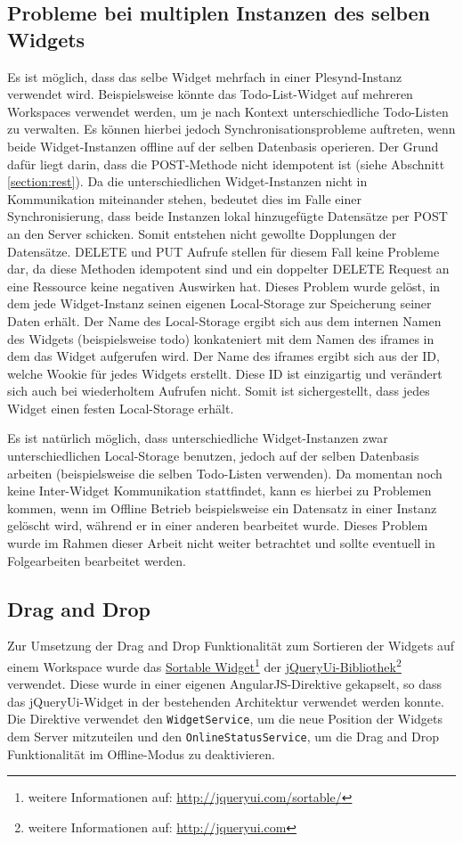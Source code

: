 \subsection{Probleme bei multiplen Instanzen des selben Widgets}
Es ist möglich, dass das selbe Widget mehrfach in einer Plesynd-Instanz verwendet wird. Beispielsweise könnte das Todo-List-Widget auf mehreren Workspaces verwendet werden, um je nach Kontext unterschiedliche Todo-Listen zu verwalten. Es können hierbei jedoch Synchronisationsprobleme auftreten, wenn beide Widget-Instanzen offline auf der selben Datenbasis operieren. Der Grund dafür liegt darin, dass die POST-Methode nicht idempotent ist (siehe Abschnitt \ref{section:rest}). Da die unterschiedlichen Widget-Instanzen nicht in Kommunikation miteinander stehen, bedeutet dies im Falle einer Synchronisierung, dass beide Instanzen lokal hinzugefügte Datensätze per POST an den Server schicken. Somit entstehen nicht gewollte Dopplungen der Datensätze. DELETE und PUT Aufrufe stellen für diesem Fall keine Probleme dar, da diese Methoden idempotent sind und ein doppelter DELETE Request an eine Ressource keine negativen Auswirken hat. Dieses Problem wurde gelöst, in dem jede Widget-Instanz seinen eigenen Local-Storage zur Speicherung seiner Daten erhält. Der Name des Local-Storage ergibt sich aus dem internen Namen des Widgets (beispielsweise todo) konkateniert mit dem Namen des iframes in dem das Widget aufgerufen wird. Der Name des iframes ergibt sich aus der ID, welche Wookie für jedes Widgets erstellt. Diese ID ist einzigartig und verändert sich auch bei wiederholtem Aufrufen nicht. Somit ist sichergestellt, dass jedes Widget einen festen Local-Storage erhält.

Es ist natürlich möglich, dass unterschiedliche Widget-Instanzen zwar unterschiedlichen Local-Storage benutzen, jedoch auf der selben Datenbasis arbeiten (beispielsweise die selben Todo-Listen verwenden). Da momentan noch keine Inter-Widget Kommunikation stattfindet, kann es hierbei zu Problemen kommen, wenn im Offline Betrieb beispielsweise ein Datensatz in einer Instanz gelöscht wird, während er in einer anderen bearbeitet wurde. Dieses Problem wurde im Rahmen dieser Arbeit nicht weiter betrachtet und sollte eventuell in Folgearbeiten bearbeitet werden.

\subsection{Drag and Drop}
Zur Umsetzung der Drag and Drop Funktionalität zum Sortieren der Widgets auf einem Workspace wurde das \href{http://jqueryui.com/sortable/}{Sortable Widget}\footnote{weitere Informationen auf: \url{http://jqueryui.com/sortable/}} der \href{http://jqueryui.com}{jQueryUi-Bibliothek}\footnote{weitere Informationen auf: \url{http://jqueryui.com}} verwendet. Diese wurde in einer eigenen AngularJS-Direktive gekapselt, so dass das jQueryUi-Widget in der bestehenden Architektur verwendet werden konnte. Die Direktive verwendet den \texttt{WidgetService}, um die neue Position der Widgets dem Server mitzuteilen und den \texttt{OnlineStatusService}, um die Drag and Drop Funktionalität im Offline-Modus zu deaktivieren.

